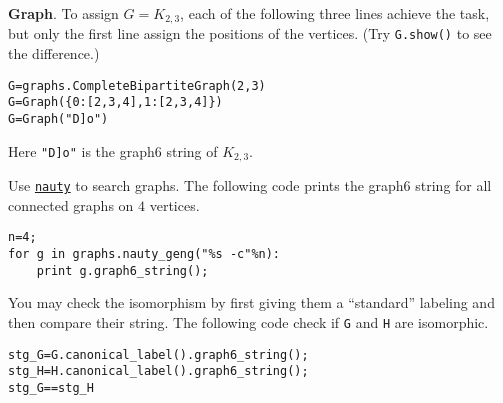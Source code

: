 \documentclass{article}
\newcommand{\heading}[1]{\medskip\textbf{#1}.}
\begin{document}
\begin{multicols}{2}
\heading{Graph}  To assign $G=K_{2,3}$, each of the following three lines achieve the task, but only the first line assign the positions of the vertices.  (Try \texttt{G.show()} to see the difference.)
\begin{obeylines}
\verb|G=graphs.CompleteBipartiteGraph(2,3)|
\verb|G=Graph({0:[2,3,4],1:[2,3,4]})|
\verb|G=Graph("D]o")|
\end{obeylines}
Here \texttt{"D]o"} is the graph6 string of $K_{2,3}$.

Use \href{http://pallini.di.uniroma1.it/}{\texttt{nauty}} to search graphs.  The following code prints the graph6 string for all connected graphs on $4$ vertices.
\begin{verbatim}
n=4;
for g in graphs.nauty_geng("%s -c"%n):
    print g.graph6_string();
\end{verbatim}

You may check the isomorphism by first giving them a ``standard'' labeling and then compare their string.  The following code check if \texttt{G} and \texttt{H} are isomorphic.
\begin{verbatim}
stg_G=G.canonical_label().graph6_string();
stg_H=H.canonical_label().graph6_string();
stg_G==stg_H
\end{verbatim}

\end{multicols}
\end{document}
